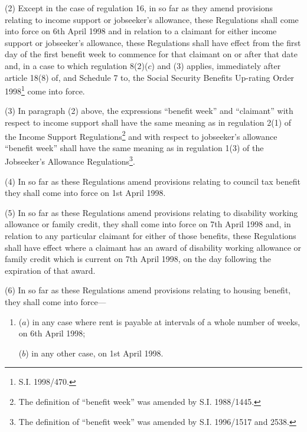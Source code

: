 \documentclass[12pt,a4paper]{article}
\begin{document}
\enlargethispage{3.30339pt}

(2) Except in the case of regulation 16, in so far as they amend provisions relating to income support or jobseeker’s allowance, these Regulations shall come into force on 6th April 1998 and in relation to a claimant for either income support or jobseeker’s allowance, these Regulations shall have effect from the first day of the first benefit week to commence for that claimant on or after that date and, in a case to which regulation 8(2)($c$)  and (3) applies, immediately after article 18(8) of, and Schedule 7 to, the Social Security Benefits Up-rating Order 1998\footnote{\frenchspacing S.I. 1998/470.} come into force.

\begin{sloppypar}
(3) In paragraph (2) above, the expressions “benefit week” and “claimant” with respect to income support shall have the same meaning as in regulation 2(1) of the Income Support Regulations\footnote{\frenchspacing The definition of “benefit week” was amended by S.I. 1988/1445.} and with respect to jobseeker’s allowance “benefit week” shall have the same meaning as in regulation 1(3) of the Jobseeker’s Allowance Regulations\footnote{\frenchspacing The definition of “benefit week” was amended by S.I. 1996/1517 and 2538.}.
\end{sloppypar}

(4) In so far as these Regulations amend provisions relating to council tax benefit they shall come into force on 1st April 1998.

(5) In so far as these Regulations amend provisions relating to disability working allowance or family credit, they shall come into force on 7th April 1998 and, in relation to any particular claimant for either of those benefits, these Regulations shall have effect where a claimant has an award of disability working allowance or family credit which is current on 7th April 1998, on the day following the expiration of that award.

(6) In so far as these Regulations amend provisions relating to housing benefit, they shall come into force—
\begin{enumerate}\item[]
($a$) in any case where rent is payable at intervals of a whole number of weeks, on 6th April 1998;

($b$) in any other case, on 1st April 1998.
\end{enumerate}
\end{document}
